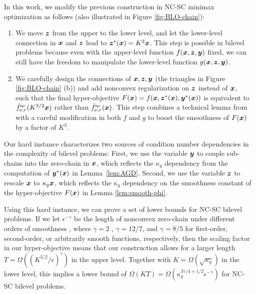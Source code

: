 \documentclass{article}
\begin{document}
In this work, we modify the previous construction in NC-SC minimax optimization as follows (also illustrated in Figure \ref{fig:BLO-chain}):
\begin{enumerate}
    \item We move ${\bm{z}}$ from the upper to the lower level, and let the lower-level connection in ${\bm{x}}$ and ${\bm{z}}$ lead to ${\bm{z}}^*({\bm{x}}) = K^2 {\bm{x}}$. This step is possible in bilevel problems because even with the upper-level function $f({\bm{x}},{\bm{z}},{\bm{y}})$ fixed, we can
   still have the freedom to manipulate the lower-level function $g({\bm{x}},{\bm{z}},{\bm{y}})$.
    \item We carefully design the connections of ${\bm{x}},{\bm{z}},{\bm{y}}$ (the triangles in Figure \ref{fig:BLO-chain} (b)) and add nonconvex regularization on ${\bm{z}}$ instead of ${\bm{x}}$, such that the final hyper-objective $F({\bm{x}}) = f({\bm{x}}, {\bm{z}}^*({\bm{x}}), {\bm{y}}^*({\bm{x}}))$ is equivalent to $\bar f^{\rm nc}_{\nu,r} (K^{3/2} {\bm{x}}) $ rather than $\bar f^{\rm nc}_{\nu,r} ({\bm{x}}) $. This step combines a technical lemma from \citep[Lemma 7]{li2021complexity} with a careful modification in both $f$ and $g$ to boost the smoothness of $F({\bm{x}})$ by a factor of $K^3$.
\end{enumerate}
{Our hard instance characterizes two sources of condition number dependencies in the complexity of bilevel problems:
First, we use the variable $
{\bm{y}}$ to couple sub-chains into the zero-chain in ${\bm{x}}$, which reflects the $\kappa_y$ dependency from the computation of ${\bm{y}}^*({\bm{x}})$ in Lemma~\ref{lem:AGD}. Second, we use the variable ${\bm{z}}$ to rescale ${\bm{x}}$ to $\kappa_y {\bm{x}}$, which reflects the $\kappa_y$ dependency on the smoothness constant of the hyper-objective $F({\bm{x}})$ in Lemma \ref{lem:smooth-phi}. }

Using this hard instance, we can prove a set of lower bounds for NC-SC bilevel problems.
If we let $\epsilon^{-\gamma}$ be the length of nonconvex zero-chain under different orders of smoothness \citep{carmon2021lower}, where $\gamma=2$ , $\gamma = 12/7$, and $\gamma = 8/5$ for first-order, second-order, or arbitrarily smooth functions, respectively, then the scaling factor in our hyper-objective means that our construction allows for a larger length $T = \Omega( (K^{3/2}/ \epsilon)^{\gamma})$ in the upper level. Together with $K = \Omega(\sqrt{\kappa_y})$ in the lower level, this implies a lower bound of $\Omega(KT) = \Omega\left(\kappa_y^{3 \gamma /4 + 1/2} \epsilon^{-\gamma} \right)$ for NC-SC bilevel problems. 

\end{document}
